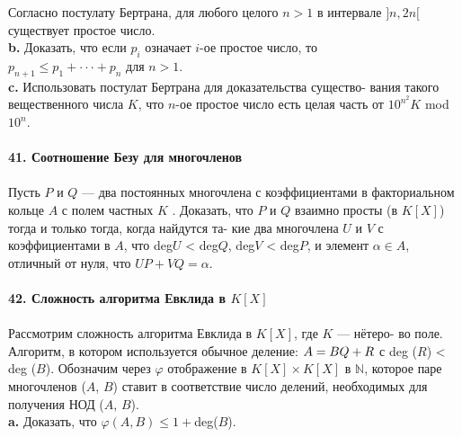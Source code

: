 \noindent\hspace*{10pt}Согласно постулату Бертрана, для любого целого $n > 1$ в интервале\linebreak
$]n, 2n[$ существует простое число.\\
\hspace*{10pt}\textbf{b.} Доказать, что если $p_i$ означает $i$-ое простое число, то\\
$p_{n+1}\leq p_1+\cdot\cdot\cdot+p_n$ для $n>1$.\\
\hspace*{10pt}\textbf{c.} Использовать постулат Бертрана для доказательства существо-\linebreak
вания такого вещественного числа $K$, что $n$-ое простое число есть целая\linebreak
часть от $10^{n{^2}} K$ mod $10^n$.
\\
\\
\noindent\textbf{41. Соотношение Безу для многочленов}\\\\
\hspace*{10pt}Пусть $P$ и $Q$ — два постоянных многочлена с коэффициентами в\linebreak
факториальном кольце $A$ с полем частных $K$ . Доказать, что $P$ и $Q$\linebreak
взаимно просты (в $K [X]$) тогда и только тогда, когда найдутся та-\linebreak
кие два многочлена $U$ и $V$ с коэффициентами в $A$, что deg$U$ < deg$Q$,\linebreak
deg$V$ < deg$P$, и элемент $\alpha \in A$, отличный от нуля, что $UP + VQ = \alpha.$
\\
\\
\noindent\textbf{42. Сложность алгоритма Евклида в $K[X]$}\\\\
\hspace*{10pt}Рассмотрим сложность алгоритма Евклида в $K[X]$, где $K$ — нётеро-\linebreak
во поле. Алгоритм, в котором используется обычное деление: $A = BQ +\linebreak
R$ с deg ($R$) < deg ($B$). Обозначим через $\varphi$ отображение в $K[X] \times K[X]$ в $\mathbb{N}$,\linebreak
которое паре многочленов ($A$, $B$) ставит в соответствие число делений,\linebreak
необходимых для получения НОД ($A$, $B$).\\
\hspace*{10pt}\textbf{a.} Доказать, что $\varphi (A,B)\leq 1 + $deg($B$).\\
